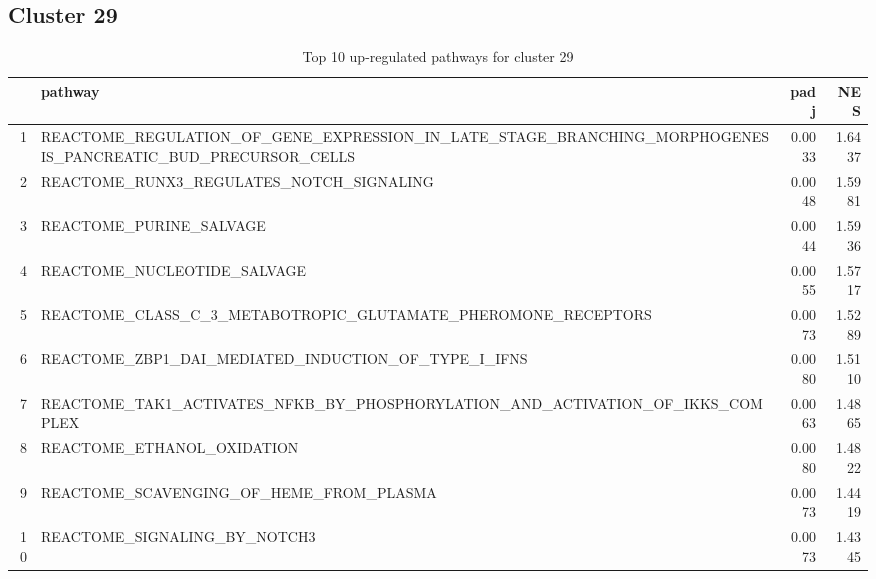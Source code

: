 \documentclass{article}
\begin{document}
\subsection{Cluster 29 }
\begin{table}[H]
\centering
\begin{tabularx}{\textwidth}{rlrr}
  \hline
 & pathway & padj & NES \\ 
  \hline
1 & REACTOME\_REGULATION\_OF\_GENE\_EXPRESSION\_IN\_LATE\_STAGE\_BRANCHING\_MORPHOGENESIS\_PANCREATIC\_BUD\_PRECURSOR\_CELLS & 0.0033 & 1.6437 \\ 
  2 & REACTOME\_RUNX3\_REGULATES\_NOTCH\_SIGNALING & 0.0048 & 1.5981 \\ 
  3 & REACTOME\_PURINE\_SALVAGE & 0.0044 & 1.5936 \\ 
  4 & REACTOME\_NUCLEOTIDE\_SALVAGE & 0.0055 & 1.5717 \\ 
  5 & REACTOME\_CLASS\_C\_3\_METABOTROPIC\_GLUTAMATE\_PHEROMONE\_RECEPTORS & 0.0073 & 1.5289 \\ 
  6 & REACTOME\_ZBP1\_DAI\_MEDIATED\_INDUCTION\_OF\_TYPE\_I\_IFNS & 0.0080 & 1.5110 \\ 
  7 & REACTOME\_TAK1\_ACTIVATES\_NFKB\_BY\_PHOSPHORYLATION\_AND\_ACTIVATION\_OF\_IKKS\_COMPLEX & 0.0063 & 1.4865 \\ 
  8 & REACTOME\_ETHANOL\_OXIDATION & 0.0080 & 1.4822 \\ 
  9 & REACTOME\_SCAVENGING\_OF\_HEME\_FROM\_PLASMA & 0.0073 & 1.4419 \\ 
  10 & REACTOME\_SIGNALING\_BY\_NOTCH3 & 0.0073 & 1.4345 \\ 
   \hline
\end{tabularx}
\caption{Top 10 up-regulated pathways for cluster 29} 
\label{tab:q3_2_29}
\end{table}
\end{document}
